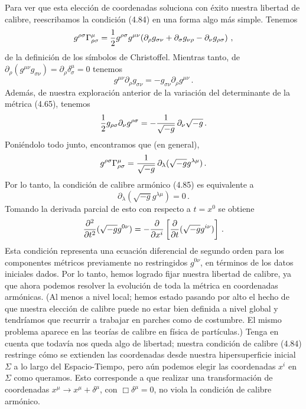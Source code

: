 \documentclass[11pt,b5paper,openany,twoside]{book}
\newcommand{\mn}{{\mu\nu}}
\newcommand{\p}[1]{{\partial_{#1}}}
\def\g{{\sqrt{-g}}}
\begin{document}
Para ver que esta elección de coordenadas soluciona con éxito nuestra libertad de calibre, reescribamos la condición (4.84) en una forma algo más simple.
Tenemos
\begin{equation}
g^{\rho\sigma}\Gamma^\mu_{\rho\sigma}={1\over 2}g^{\rho\sigma}
g^\mn(\p\rho g_{\sigma\nu}+\p\sigma g_{\nu\rho} -\p\nu
g_{\rho\sigma})\ ,\label{4.86}
\end{equation}
de la definición de los símbolos de Christoffel.
Mientras tanto, de $\p\rho(g^\mn g_{\sigma\nu})=\p\rho\delta^\mu_\sigma=0$ tenemos
\begin{equation}
g^\mn\p\rho g_{\sigma\nu} = - g_{\sigma\nu}\p\rho g^\mn\,.\label{4.87}
\end{equation}
Además, de nuestra exploración anterior de la variación del determinante de la métrica (4.65), tenemos
\begin{equation}
{1\over 2}g_{\rho\sigma}\p\nu g^{\rho\sigma} =
-{1\over{\g}}\,\p\nu \g\,.\label{4.88}
\end{equation}
Poniéndolo todo junto, encontramos que (en general),
\begin{equation}
g^{\rho\sigma}\Gamma^\mu_{\rho\sigma}={1\over{\g}}\,\p\lambda
(\g g^{\lambda\mu})\,.\label{4.89}
\end{equation}
Por lo tanto, la condición de calibre armónico (4.85) es equivalente a
\begin{equation}
\p\lambda(\g g^{\lambda\mu})=0\,.\label{4.90}
\end{equation}
Tomando la derivada parcial de esto con respecto a $t=x^0$ se obtiene
\begin{equation}
{{\partial^2}\over{\partial t^2}}(\g g^{0\nu})=
-{{\partial}\over{\partial x^i}}\left[{{\partial}\over
{\partial t}}(\g g^{i\nu})\right]\,.\label{4.91}
\end{equation}
Esta condición representa una ecuación diferencial de segundo orden para los componentes métricos previamente no restringidos $g^{0\nu}$, en términos de los datos iniciales dados.
Por lo tanto, hemos logrado fijar nuestra libertad de calibre, ya que ahora podemos resolver la evolución de toda la métrica en coordenadas armónicas.
(Al menos a nivel local; hemos estado pasando por alto el hecho de que nuestra elección de calibre puede no estar bien definida a nivel global y tendríamos que recurrir a trabajar en parches como de costumbre.
El mismo problema aparece en las teorías de calibre en física de partículas.)
Tenga en cuenta que todavía nos queda algo de libertad; nuestra condición de calibre (4.84) restringe cómo se extienden las coordenadas desde nuestra hipersuperficie inicial $\Sigma$ a lo largo del Espacio-Tiempo, pero aún podemos elegir las coordenadas $x^i$ en $\Sigma$ como queramos.
Esto corresponde a que realizar una transformación de coordenadas $x^\mu \rightarrow x^\mu +\delta^\mu$, con $\Box \delta^\mu=0$, no viola la condición de calibre armónico.
\end{document}
